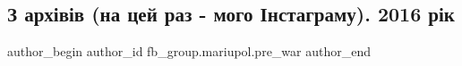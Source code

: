  
 
 
 
 

\subsection{З архівів (на цей раз - мого Інстаграму). 2016 рік}
\label{sec:04_02_2023.fb.fb_group.mariupol.pre_war.3.z_arkh_v_v__na_tsei_}

\ifcmt
 author_begin
   author_id fb_group.mariupol.pre_war
 author_end
\fi
